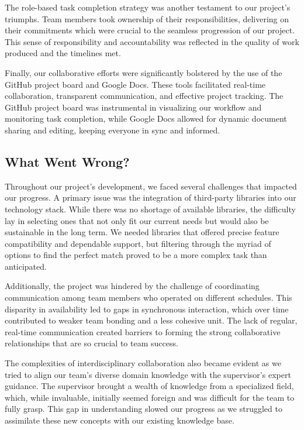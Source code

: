 \documentclass{article}
\begin{document}
The role-based task completion strategy was another testament to our project's triumphs. Team members took ownership of their responsibilities, delivering on their commitments which were crucial to the seamless progression of our project. This sense of responsibility and accountability was reflected in the quality of work produced and the timelines met.

Finally, our collaborative efforts were significantly bolstered by the use of the GitHub project board and Google Docs. These tools facilitated real-time collaboration, transparent communication, and effective project tracking. The GitHub project board was instrumental in visualizing our workflow and monitoring task completion, while Google Docs allowed for dynamic document sharing and editing, keeping everyone in sync and informed.

\subsection{What Went Wrong?}
Throughout our project's development, we faced several challenges that impacted our progress. A primary issue was the integration of third-party libraries into our technology stack. While there was no shortage of available libraries, the difficulty lay in selecting ones that not only fit our current needs but would also be sustainable in the long term. We needed libraries that offered precise feature compatibility and dependable support, but filtering through the myriad of options to find the perfect match proved to be a more complex task than anticipated.

Additionally, the project was hindered by the challenge of coordinating communication among team members who operated on different schedules. This disparity in availability led to gaps in synchronous interaction, which over time contributed to weaker team bonding and a less cohesive unit. The lack of regular, real-time communication created barriers to forming the strong collaborative relationships that are so crucial to team success.

The complexities of interdisciplinary collaboration also became evident as we tried to align our team’s diverse domain knowledge with the supervisor's expert guidance. The supervisor brought a wealth of knowledge from a specialized field, which, while invaluable, initially seemed foreign and was difficult for the team to fully grasp. This gap in understanding slowed our progress as we struggled to assimilate these new concepts with our existing knowledge base.
\end{document}

